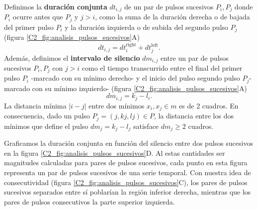 \documentclass[./main.tex]{subfiles}
\begin{document}
Definimos la \textbf{duración conjunta} $dt_{i,j}$ de un par de pulsos sucesivos $P_i, P_j$ donde $P_i$ ocurre antes que $P_j$ y $j >i$, como la suma de la duración derecha o de bajada del primer pulso $P_i$ y la duración izquierda o de subida del segundo pulso $P_j$ (figura \ref{C2_fig:analisis_pulsos_sucesivos}A) 
\begin{equation}
    dt_{i,j} = dt_i^{\text{right}} + dt_j^{\text{left}}.
\end{equation}
Además, definimos el \textbf{intervalo de silencio} $dm_{i,j}$ entre un par de pulsos sucesivos $P_i, P_j$ con $j >i$ como el tiempo transcurrido entre el final del primer pulso $P_i$ -marcado con su mínimo derecho- y el inicio del pulso segundo pulso $P_j$-marcado con su mínimo izquierdo- (figura \ref{C2_fig:analisis_pulsos_sucesivos}A) 
\begin{equation}
    dm_{i,j} = k_j - l_i. \label{C2_eq:silencios}
\end{equation}
La distancia mínima $|i-j|$ entre dos mínimos $x_i, x_j \in m$ es de 2 cuadros. En consecuencia, dado un pulso $P_j=(j, kj, lj) \in P$, la distancia entre los dos mínimos que define el pulso $dm_j= k_j-l_j$ satisface $dm_j \geq 2$ cuadros. 


Graficamos la duración conjunta en función del silencio entre dos pulsos sucesivos en la figura \ref{C2_fig:analisis_pulsos_sucesivos}D. Al estas cantidades ser magnitudes calculadas para pares de pulsos sucesivos, cada punto en esta figura representa un par de pulsos sucesivos de una serie temporal. Con nuestra idea de consecutividad (figura \ref{C2_fig:analisis_pulsos_sucesivos}C), los pares de pulsos sucesivos separados entre sí poblarían la región inferior derecha, mientras que los pares de pulsos consecutivos la parte superior izquierda. 
\end{document}
